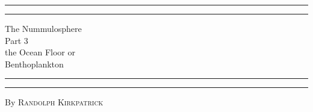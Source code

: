 \documentclass[a4paper, 12pt, oneside]{article}
\begin{document}
\begin{titlepage} %
	\centering %
	\scshape %

	
	\rule{\textwidth}{1.6pt}\vspace*{-\baselineskip}\vspace*{2pt} %
	\rule{\textwidth}{0.4pt} %
	
	\vspace{0.75\baselineskip} %
	
	{\LARGE The Nummulosphere\\ Part 3\\ the Ocean Floor or\\ Benthoplankton\\} %
	
	\vspace{0.75\baselineskip} %
	
	\rule{\textwidth}{0.4pt}\vspace*{-\baselineskip}\vspace{3.2pt} %
	\rule{\textwidth}{1.6pt} %
	
	\vspace{1\baselineskip} %
	
	
	{By \scshape\Large Randolph Kirkpatrick\\} %
	
	\vspace*{1\baselineskip} %
	
	
	\vspace{1\baselineskip} %

	
	

\end{titlepage}
\end{document}
